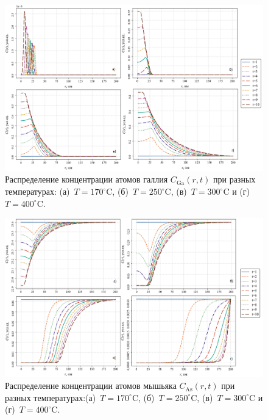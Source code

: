\documentclass[14pt,oneside]{extarticle}
\begin{document}
\begin{figure}[H]
    \begin{center}
    \includegraphics[width=18cm]{images/C_Ga_t.png}
    \caption{\label{fig:c_ga_t} Распределение концентрации атомов галлия $C_{\text{Ga}}(r, t)$ при разных температурах: (а)~$T = 170^\circ$C, (б)~$T = 250^\circ$C, (в)~$T = 300^\circ$C и (г)~$T = 400^\circ$C.}
    \end{center}
\end{figure}

\begin{figure}[H]
    \begin{center}
    \includegraphics[width=18cm]{images/C_As_t.png}
    \caption{\label{fig:c_as_t} Распределение концентрации атомов мышьяка $C_{\text{As}}(r, t)$ при разных температурах:(а)~$T = 170^\circ$C, (б)~$T = 250^\circ$C, (в)~$T = 300^\circ$C и (г)~$T = 400^\circ$C.}
    \end{center}
\end{figure}
\end{document}

